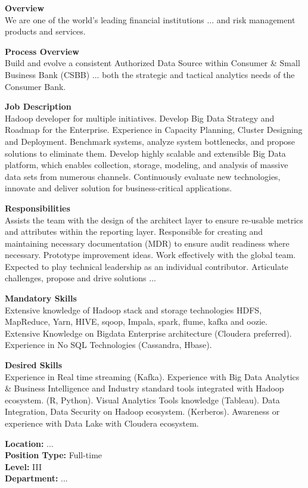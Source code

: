 \clearpage
\begin{tcolorbox}[colback=boxbackground,colframe=boxframe,sharp corners,
title=Sample Job Description,
label=box:vacancy_posting]
\noindent \textbf{Overview}\\
We are one of the world's leading financial institutions ... and risk management products and services.

\noindent \textbf{Process Overview}\\
Build and evolve a consistent Authorized Data Source within Consumer \& Small Business Bank (CSBB) ... both the strategic and tactical analytics needs of the Consumer Bank.

\noindent \textbf{Job Description}\\
Hadoop developer for multiple initiatives. Develop Big Data Strategy and Roadmap for the Enterprise. Experience in Capacity Planning, Cluster Designing and Deployment. Benchmark systems, analyze system bottlenecks, and propose solutions to eliminate them. Develop highly scalable and extensible Big Data platform, which enables collection, storage, modeling, and analysis of massive data sets from numerous channels. Continuously evaluate new technologies, innovate and deliver solution for business-critical applications.

\noindent \textbf{Responsibilities}\\
Assists the team with the design of the architect layer to ensure re-usable metrics and attributes within the reporting layer. Responsible for creating and maintaining necessary documentation (MDR) to ensure audit readiness where necessary. Prototype improvement ideas. Work effectively with the global team. Expected to play technical leadership as an individual contributor. Articulate challenges, propose and drive solutions ...

\noindent \textbf{Mandatory Skills}\\
Extensive knowledge of Hadoop stack and storage technologies HDFS, MapReduce, Yarn, HIVE, sqoop, Impala, spark, flume, kafka and oozie. Extensive Knowledge on Bigdata Enterprise architecture (Cloudera preferred). Experience in No SQL Technologies (Cassandra, Hbase).

\noindent \textbf{Desired Skills}\\
Experience in Real time streaming (Kafka). Experience with Big Data Analytics \& Business Intelligence and Industry standard tools integrated with Hadoop ecosystem. (R, Python). Visual Analytics Tools knowledge (Tableau). Data Integration, Data Security on Hadoop ecosystem. (Kerberos). Awareness or experience with Data Lake with Cloudera ecosystem.

\noindent \textbf{Location:} ...\\
\textbf{Position Type:} Full-time\\
\textbf{Level:} III\\
\textbf{Department:} ...
\end{tcolorbox}

